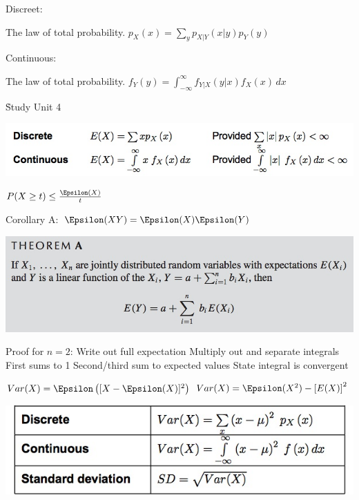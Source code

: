 \documentclass{/out/app/latex/examnotes}
\begin{document}
{

Discreet:

The law of total probability. $p_X(x)=\displaystyle\sum_y{p_{X|Y}(x|y)p_Y(y)}$

Continuous:

The law of total probability. $f_Y(y)=\displaystyle\int_{-\infty}^\infty{f_{Y|X}(y|x)f_X(x)\,dx}$

\h{Study Unit 4}

\includegraphics[scale=0.5]{./img/41.jpg}

$P(X\ge t)\le \frac{\Epsilon(X)}{t}$

\ra Corollary A:  $\E(XY)=\E(X)\E(Y)$

\includegraphics[scale=0.4]{./img/412A.jpg}

\ra Proof for $n=2$: 
 Write out full expectation
 Multiply out and separate integrals
 First sums to 1
 Second/third sum to expected values
 State integral is convergent


$Var(X)=\E\left([X-\E(X)]^2\right) $
$Var(X)=\E(X^2)-\left[E(X)\right]^2$

\vspace{6pt}
\includegraphics[scale=0.4]{./img/42.jpg}

}
\end{document}
